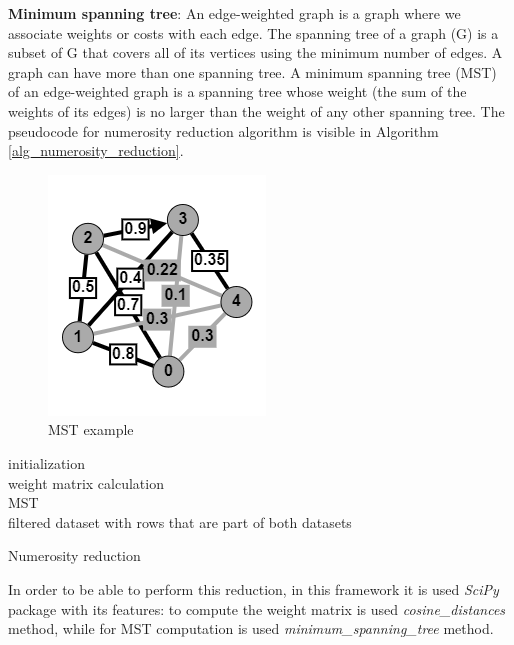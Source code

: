 \documentclass[\main/main.tex]{subfiles}
\begin{document}
\textbf{Minimum spanning tree}: An edge-weighted graph is a graph where we associate weights or costs with each edge. The spanning tree of a graph (G) is a subset of G that covers all of its vertices using the minimum number of edges. A graph can have more than one spanning tree. A minimum spanning tree (MST) \cite{books/daglib/0029345} of an edge-weighted graph is a spanning tree whose weight (the sum of the weights of its edges) is no larger than the weight of any other spanning tree. The pseudocode for numerosity reduction algorithm is visible in Algorithm \ref{alg_numerosity_reduction}.
\begin{center}
    \begin{figure}[h]
    \centering
    \includegraphics[scale=1.25]{images/methods/mst_example.png}
    \caption{MST example}
    \label{fig:mst_example}
\end{figure}
\end{center}
\begin{center}
    \begin{algorithm}[H]
     initialization \\
     weight matrix calculation \\
     MST \\
     \Return filtered dataset with rows that are part of both datasets
     \caption{Numerosity reduction}
     \label{alg_numerosity_reduction}
    \end{algorithm}
\end{center}
In order to be able to perform this reduction, in this framework it is used \emph{SciPy} \cite{2020SciPyNMeth} package with its features: to compute the weight matrix is used \emph{cosine\_distances} method, while for MST computation is used \emph{minimum\_spanning\_tree} method.
\end{document}
